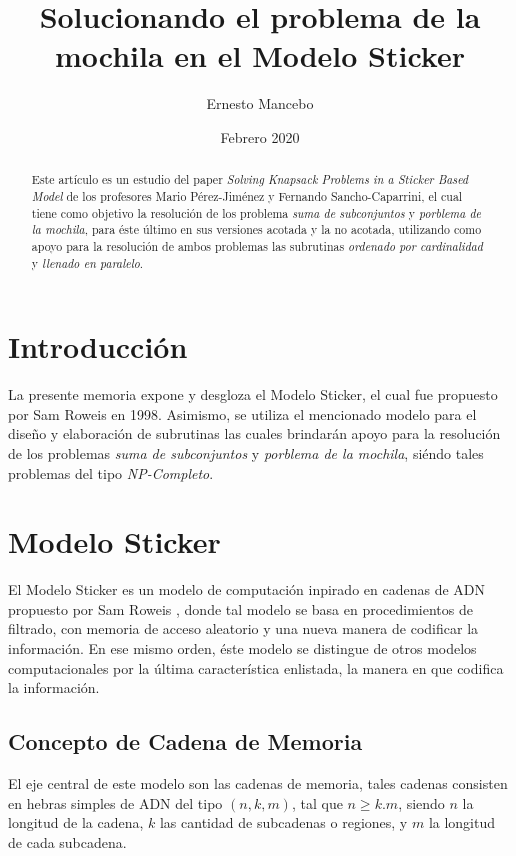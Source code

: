 \documentclass[12pt, letterpaper, twoside]{article}
\title{Solucionando el problema de la mochila en el Modelo Sticker}
\author{Ernesto Mancebo}
\date{Febrero 2020}
\begin{document}
    \maketitle
    \begin{abstract}
        Este artículo es un estudio del paper \emph{Solving Knapsack Problems in a Sticker Based Model} de los profesores Mario P{\'e}rez-Jim{\'e}nez y Fernando Sancho-Caparrini\autocite{ref10.1007/3-540-48017-X_15}, el cual tiene como objetivo la resolución de los problema \emph{suma de subconjuntos} y \emph{porblema de la mochila}, para éste último en sus versiones acotada y la no acotada, utilizando como apoyo para la resolución de ambos problemas las subrutinas \emph{ordenado por cardinalidad} y \emph{llenado en paralelo}.
    \end{abstract}

    \newpage
    \tableofcontents

    \newpage
    \section{Introducción}
    La presente memoria expone y desgloza el Modelo Sticker, el cual fue propuesto por Sam Roweis en 1998. Asimismo, se utiliza el mencionado modelo para el diseño y elaboración de subrutinas las cuales brindarán apoyo para la resolución de los problemas \emph{suma de subconjuntos} y \emph{porblema de la mochila}, siéndo tales problemas del tipo \emph{NP-Completo}.

    \section{Modelo Sticker}
    El Modelo Sticker es un modelo de computación inpirado en cadenas de ADN propuesto por Sam Roweis \autocite{sticker_model}, donde tal modelo se basa en procedimientos de filtrado, con memoria de acceso aleatorio y una nueva manera de codificar la información. En ese mismo orden, éste modelo se distingue de otros modelos computacionales por la última característica enlistada, la manera en que codifica la información.

    \subsection{Concepto de Cadena de Memoria}
    El eje central de este modelo son las cadenas de memoria, tales cadenas consisten en hebras simples de ADN del tipo $(n, k, m)$, tal que $n\geq k.m$, siendo $n$ la longitud de la cadena, $k$ las cantidad de subcadenas o regiones, y $m$ la longitud de cada subcadena.
\end{document}
